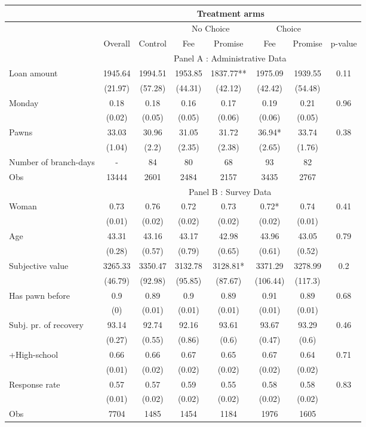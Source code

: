 \begin{tabular}{lccccccc}
\toprule
      &       & \multicolumn{5}{c}{Treatment arms}    &  \\
\midrule
      &       &       & \multicolumn{2}{c}{No Choice } & \multicolumn{2}{c}{Choice} &  \\
\midrule
\midrule
      & Overall & Control & Fee   & Promise & Fee   & Promise & p-value \\
\midrule
      & \multicolumn{7}{c}{Panel A : Administrative Data} \\
\midrule
\midrule
Loan amount  & 1945.64 & 1994.51 & 1953.85 & 1837.77** & 1975.09 & 1939.55 & 0.11 \\
      & (21.97) & (57.28) & (44.31) & (42.12) & (42.42) & (54.48) &  \\
Monday & 0.18  & 0.18  & 0.16  & 0.17  & 0.19  & 0.21  & 0.96 \\
      & (0.02) & (0.05) & (0.05) & (0.06) & (0.06) & (0.05) &  \\
Pawns & 33.03 & 30.96 & 31.05 & 31.72 & 36.94* & 33.74 & 0.38 \\
      & (1.04) & (2.2) & (2.35) & (2.38) & (2.65) & (1.76) &  \\
\midrule
Number of branch-days & -     & 84    & 80    & 68    & 93    & 82    &  \\
Obs   & 13444 & 2601  & 2484  & 2157  & 3435  & 2767  &  \\
\midrule
      & \multicolumn{7}{c}{Panel B : Survey Data} \\
\midrule
\midrule
Woman & 0.73  & 0.76  & 0.72  & 0.73  & 0.72* & 0.74  & 0.41 \\
      & (0.01) & (0.02) & (0.02) & (0.02) & (0.02) & (0.01) &  \\
Age   & 43.31 & 43.16 & 43.17 & 42.98 & 43.96 & 43.05 & 0.79 \\
      & (0.28) & (0.57) & (0.79) & (0.65) & (0.61) & (0.52) &  \\
Subjective value & 3265.33 & 3350.47 & 3132.78 & 3128.81* & 3371.29 & 3278.99 & 0.2 \\
      & (46.79) & (92.98) & (95.85) & (87.67) & (106.44) & (117.3) &  \\
Has pawn before & 0.9   & 0.89  & 0.9   & 0.89  & 0.91  & 0.89  & 0.68 \\
      & (0)   & (0.01) & (0.01) & (0.01) & (0.01) & (0.01) &  \\
Subj. pr. of recovery & 93.14 & 92.74 & 92.16 & 93.61 & 93.67 & 93.29 & 0.46 \\
      & (0.27) & (0.55) & (0.86) & (0.6) & (0.47) & (0.6) &  \\
+High-school & 0.66  & 0.66  & 0.67  & 0.65  & 0.67  & 0.64  & 0.71 \\
      & (0.01) & (0.02) & (0.02) & (0.02) & (0.02) & (0.02) &  \\
Response rate & 0.57  & 0.57  & 0.59  & 0.55  & 0.58  & 0.58  & 0.83 \\
      & (0.01) & (0.02) & (0.02) & (0.02) & (0.02) & (0.02) &  \\
\midrule
Obs   & 7704  & 1485  & 1454  & 1184  & 1976  & 1605  &  \\
\bottomrule
\bottomrule
\end{tabular}%
